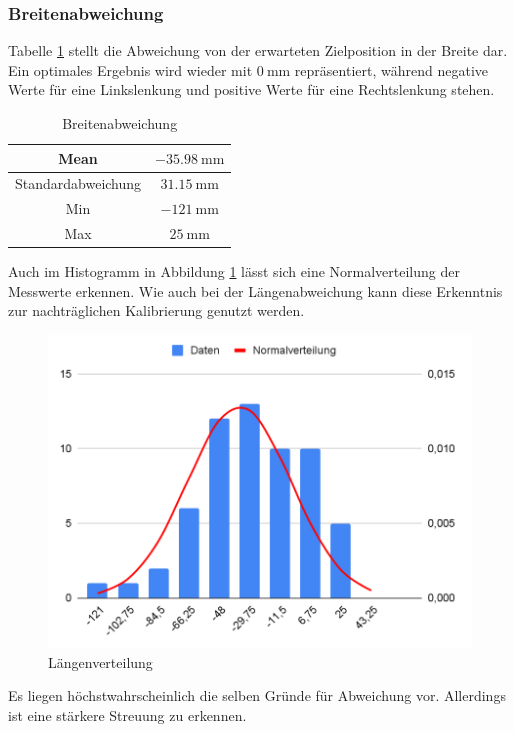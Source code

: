 \documentclass[ngerman]{tudscrreprt}
\begin{document}
\subsubsection{Breitenabweichung}
Tabelle \ref{table:breitenabweichung} stellt die Abweichung von der erwarteten
Zielposition in der Breite dar. Ein optimales Ergebnis wird wieder mit $\SI{0}{\mm}$
repräsentiert, während negative Werte für eine Linkslenkung und positive Werte für eine
Rechtslenkung stehen.
%
\begin{table}[H]
    \centering
    \begin{tabular}{|c|c|}
    \hline
    Mean               & $\SI{-35,98}{\mm}$ \\ \hline
    Standardabweichung & $\SI{31,15}{\mm}$ \\ \hline
    Min                & $\SI{-121}{\mm}$ \\ \hline
    Max                & $\SI{25}{\mm}$ \\ \hline
    \end{tabular}
    \caption{Breitenabweichung}
    \label{table:breitenabweichung}
\end{table}
%
Auch im Histogramm in Abbildung \ref{figure:breitenverteilung} lässt sich eine
Normalverteilung der Messwerte erkennen. Wie auch bei der Längenabweichung kann diese
Erkenntnis zur nachträglichen Kalibrierung genutzt werden. 
%
\begin{figure}[H]
    \centering
    \includegraphics[scale=0.5]{src/charts/breitenverteilung.png}
    \caption{Längenverteilung}
    \label{figure:breitenverteilung}
\end{figure}
Es liegen höchstwahrscheinlich die selben Gründe für Abweichung vor. Allerdings ist eine
stärkere Streuung zu erkennen. 
\end{document}
